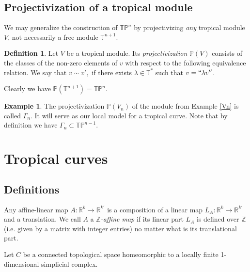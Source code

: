 \documentclass[12pt]{amsart}
\theoremstyle{plain}
\theoremstyle{definition}
\newtheorem{definition}[theorem]{Definition}
\newtheorem{example}[theorem]{Example}
\theoremstyle{remark}
\newcommand{\Z}{\mathbb Z}    %
\newcommand{\R}{\mathbb R}    %
\newcommand{\PP}{\mathbb P}   %
\newcommand{\T}{\mathbb T}    %
\newcommand{\<}{\langle}   %
\renewcommand{\>}{\rangle} %
\begin{document}
\subsection{Projectivization of a tropical module}

We may generalize the construction of $\T\PP^n$
by projectivizing {\em any} tropical module $V$, not
necessarily a free module $\T^{n+1}$.
\begin{definition}
Let $V$ be a tropical module.
Its {\em projectivization} $\PP(V)$ consists of the classes
of the non-zero elements of $v$
with respect to the following equivalence relation.
We say that $v\sim v',$
if there exists $\lambda\in\T^*$ such that $v=``\lambda v''$.
\end{definition}
Clearly we have $\PP(\T^{n+1})=\T\PP^n$.

\begin{example}
\label{Gamma-n}
The projectivization $\PP(V_n)$ of the module from Example \ref{Vn}
is called $\Gamma_n$. It will serve as our local model
for a tropical curve.
Note that by definition we have
$\Gamma_n\subset\T\PP^{n-1}$.
\end{example}



\section{Tropical curves}
\subsection{Definitions}
Any affine-linear map $A:\R^k\to\R^{k'}$ is a composition
of a linear map $L_A:\R^k\to\R^{k'}$ and a translation.
We call $A$ a {\em $\Z$-affine map} if its linear part $L_A$
is defined over $\Z$ (i.e. given by a matrix with integer entries)
no matter what is its translational part.

Let $C$ be a connected topological space
homeomorphic to a locally finite 1-dimensional simplicial complex.
\end{document}
